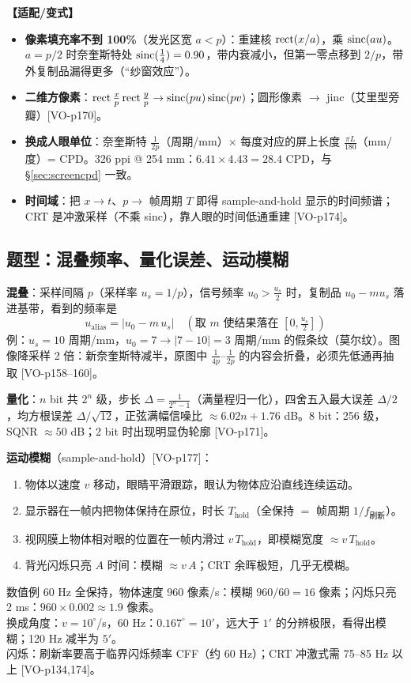 \textbf{【适配/变式】}
\begin{itemize}
\item \textbf{像素填充率不到 100\%}（发光区宽 $a<p$）：重建核 $\operatorname{rect}(x/a)$，乘 $\operatorname{sinc}(au)$。$a=p/2$ 时奈奎斯特处 $\operatorname{sinc}(\frac14)=0.90$，带内衰减小，但第一零点移到 $2/p$，带外复制品漏得更多（“纱窗效应”）。
\item \textbf{二维方像素}：$\operatorname{rect}\frac xp\operatorname{rect}\frac yp\to\operatorname{sinc}(pu)\operatorname{sinc}(pv)$；圆形像素 $\to$ jinc（艾里型旁瓣）[VO-p170]。
\item \textbf{换成人眼单位}：奈奎斯特 $\frac1{2p}$（周期/mm）$\times$ 每度对应的屏上长度 $\frac{\pi L}{180}$（mm/度）= CPD。326 ppi @ 254 mm：$6.41\times4.43=28.4$ CPD，与 §\ref{sec:screencpd} 一致。
\item \textbf{时间域}：把 $x\to t$、$p\to$ 帧周期 $T$ 即得 sample-and-hold 显示的时间频谱；CRT 是冲激采样（不乘 sinc），靠人眼的时间低通重建 [VO-p174]。
\end{itemize}

\subsection{题型：混叠频率、量化误差、运动模糊}\label{sec:alias}
\textbf{混叠}：采样间隔 $p$（采样率 $u_s=1/p$），信号频率 $u_0>\frac{u_s}2$ 时，复制品 $u_0-mu_s$ 落进基带，看到的频率是
\[
u_{\text{alias}}=\big|u_0-m\,u_s\big|\quad(\text{取 }m\text{ 使结果落在 }[0,\tfrac{u_s}2])
\]
例：$u_s=10$ 周期/mm，$u_0=7\to|7-10|=3$ 周期/mm 的假条纹（莫尔纹）。图像降采样 2 倍：新奈奎斯特减半，原图中 $\frac1{4p}$–$\frac1{2p}$ 的内容会折叠，必须先低通再抽取 [VO-p158–160]。

\textbf{量化}：$n$ bit 共 $2^n$ 级，步长 $\Delta=\frac{1}{2^n-1}$（满量程归一化），四舍五入最大误差 $\Delta/2$，均方根误差 $\Delta/\sqrt{12}$，正弦满幅信噪比 $\approx6.02n+1.76$ dB。8 bit：256 级，SQNR $\approx50$ dB；2 bit 时出现明显伪轮廓 [VO-p171]。

\textbf{运动模糊}（sample-and-hold）[VO-p177]：
\begin{enumerate}
\item 物体以速度 $v$ 移动，眼睛平滑跟踪，眼认为物体应沿直线连续运动。
\item 显示器在一帧内把物体保持在原位，时长 $T_{\text{hold}}$（全保持 $=$ 帧周期 $1/f_{\text{刷新}}$）。
\item 视网膜上物体相对眼的位置在一帧内滑过 $v\,T_{\text{hold}}$，即模糊宽度 $\approx v\,T_{\text{hold}}$。
\item 背光闪烁只亮 $A$ 时间：模糊 $\approx v\,A$；CRT 余晖极短，几乎无模糊。
\end{enumerate}
\begin{exam}{数值例}
60 Hz 全保持，物体速度 960 像素/s：模糊 $960/60=16$ 像素；闪烁只亮 2 ms：$960\times0.002\approx1.9$ 像素。\\
换成角度：$v=10^\circ$/s，60 Hz：$0.167^\circ=10'$，远大于 $1'$ 的分辨极限，看得出模糊；120 Hz 减半为 $5'$。\\
闪烁：刷新率要高于临界闪烁频率 CFF（约 60 Hz）；CRT 冲激式需 75–85 Hz 以上 [VO-p134,174]。
\end{exam}

